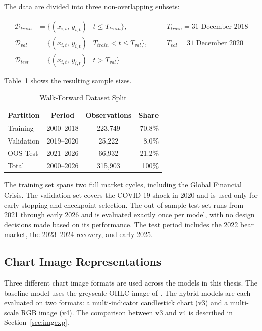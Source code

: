 The data are divided into three non-overlapping subsets:

\begin{align}
\mathcal{D}_{train} &= \{(x_{i,t},\, y_{i,t}) \mid t \leq T_{train}\}, \quad &&T_{train} = \text{31 December 2018} \label{eq:train}\\
\mathcal{D}_{val}   &= \{(x_{i,t},\, y_{i,t}) \mid T_{train} < t \leq T_{val}\}, \quad &&T_{val} = \text{31 December 2020} \label{eq:val}\\
\mathcal{D}_{test}  &= \{(x_{i,t},\, y_{i,t}) \mid t > T_{val}\} \label{eq:test}
\end{align}

Table~\ref{tab:split} shows the resulting sample sizes.

\begin{table}[H]
\centering
\caption{Walk-Forward Dataset Split}
\label{tab:split}
\begin{tabular}{lccr}
\toprule
\textbf{Partition} & \textbf{Period} & \textbf{Observations} & \textbf{Share} \\
\midrule
Training   & 2000--2018 & 223,749 & 70.8\% \\
Validation & 2019--2020 &  25,222 &  8.0\% \\
OOS Test   & 2021--2026 &  66,932 & 21.2\% \\
\midrule
Total      & 2000--2026 & 315,903 & 100\%  \\
\bottomrule
\end{tabular}
\end{table}

The training set spans two full market cycles, including the Global Financial Crisis. The validation set covers the COVID-19 shock in 2020 and is used only for early stopping and checkpoint selection. The out-of-sample test set runs from 2021 through early 2026 and is evaluated exactly once per model, with no design decisions made based on its performance. The test period includes the 2022 bear market, the 2023--2024 recovery, and early 2025.

\subsection{Chart Image Representations}
\label{sec:images}

Three different chart image formats are used across the models in this thesis. The baseline model uses the greyscale OHLC image of \textcite{Jiang2023}. The hybrid models are each evaluated on two formats: a multi-indicator candlestick chart (v3) and a multi-scale RGB image (v4). The comparison between v3 and v4 is described in Section~\ref{sec:imgexp}.

